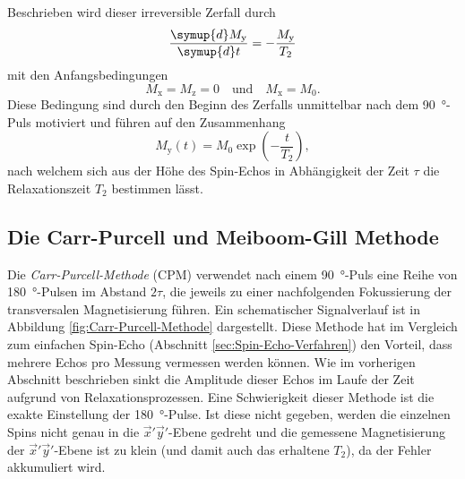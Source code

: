Beschrieben wird dieser irreversible Zerfall durch
\begin{equation*}
  \frac{\symup{d} M_\text{y}}{\symup{d} t} = - \frac{M_\text{y}}{T_2}
\end{equation*}
mit den Anfangsbedingungen
\begin{equation*}
  M_\text{x} = M_\text{z} = 0 \quad \text{und} \quad M_\text{x} = M_0.
\end{equation*}
Diese Bedingung sind durch den Beginn des Zerfalls unmittelbar nach dem
\SI{90}{\degree}-Puls motiviert und führen auf den Zusammenhang
\begin{equation}
  M_\text{y}\!\left(t\right) = M_0 \exp\!\left(- \frac{t}{T_2}\right),
  \label{eqn:Spin-Echo-Statisch}
\end{equation}
nach welchem sich aus der Höhe des Spin-Echos in Abhängigkeit der
Zeit $\tau$ die Relaxationszeit $T_2$ bestimmen lässt.


\subsection{Die Carr-Purcell und Meiboom-Gill Methode}
\label{sec:CP-und-MG}

Die \emph{Carr-Purcell-Methode} (CPM) verwendet nach einem \SI{90}{\degree}-Puls
eine Reihe von \SI{180}{\degree}-Pulsen im Abstand $2 \tau$, die jeweils
zu einer nachfolgenden Fokussierung der transversalen Magnetisierung führen.
Ein schematischer Signalverlauf ist in Abbildung \ref{fig:Carr-Purcell-Methode}
dargestellt.
Diese Methode hat im Vergleich zum einfachen Spin-Echo
(Abschnitt \ref{sec:Spin-Echo-Verfahren}) den Vorteil, dass mehrere
Echos pro Messung vermessen werden können.
Wie im vorherigen Abschnitt beschrieben sinkt die Amplitude dieser Echos im
Laufe der Zeit aufgrund von Relaxationsprozessen.
Eine Schwierigkeit dieser Methode ist die exakte Einstellung der
\SI{180}{\degree}-Pulse.
Ist diese nicht gegeben, werden die einzelnen Spins nicht genau in die
$\vec{x}' \vec{y}'$-Ebene gedreht und die gemessene Magnetisierung
der $\vec{x}' \vec{y}'$-Ebene ist zu klein (und damit auch das erhaltene $T_2$),
da der Fehler akkumuliert wird.

